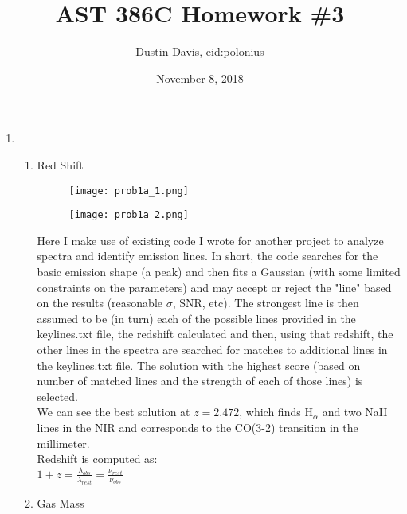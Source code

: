 \documentclass[11pt]{article}
\title{AST 386C Homework \#3}
\author{Dustin Davis, eid:polonius}
\date{November 8, 2018}
\begin{document}
\maketitle



\newpage 



\begin{enumerate}
\item  %
	
	\begin{enumerate}
	\item Red Shift\\
	
    \begin{figure}[H]
		\texttt{[image: prob1a\_1.png]}
		\caption{}
		\label{}
	\end{figure}
	
	\begin{figure}[H]
			\texttt{[image: prob1a\_2.png]}
			\caption{}
			\label{}
	\end{figure}
	  
	Here I make use of existing code I wrote for another project to analyze spectra and identify emission lines. In short, the code searches for the basic emission shape (a peak) and then fits a Gaussian (with some limited constraints on the parameters) and may accept or reject the "line" based on the results (reasonable $\sigma$, SNR, etc). The strongest line is then assumed to be (in turn) each of the possible lines provided in the keylines.txt file, the redshift calculated and then, using that redshift, the other lines in the spectra are searched for matches to additional lines in the keylines.txt file. The solution with the highest score (based on number of matched lines and the strength of each of those lines) is selected.\\
	
	We can see the best solution at $z = 2.472$, which finds H$_{\alpha}$ and two NaII lines in the NIR and corresponds to the CO(3-2) transition in the millimeter.\\
	
	Redshift is computed as:\\
	
	\hspace{10mm} $1 + z = \frac{\displaystyle\lambda_{obs}}{\displaystyle \lambda_{rest}} = \frac{\displaystyle\nu_{rest}}{\displaystyle \nu_{obs}}$\\
	
	\item Gas Mass%
 
   \end{enumerate}

\end{enumerate}
\end{document}
